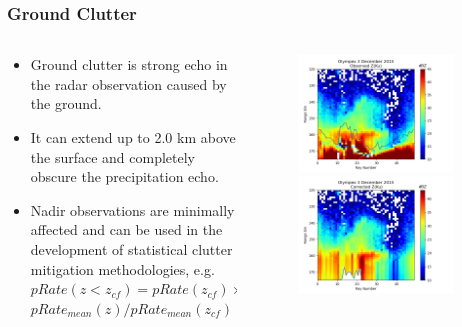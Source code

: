 \documentclass{beamer}
\begin{document}
\begin{frame}
\begin{columns}
\begin{column}{0.5\textwidth}
\begin{figure}
\begin{center}
\end{center}
\end{figure}
\end{column}
\end{columns}
\end{frame}    
\begin{frame}
\frametitle{Ground Clutter}
\begin{columns}
\begin{column}{0.55\textwidth}
    \begin{itemize}
    \item Ground clutter is strong echo in the radar observation caused 
    by the ground.
    \item It can extend up to 2.0 km above the surface and completely 
    obscure the precipitation echo.
    \item Nadir observations are minimally affected 
    and can be used in the development of statistical clutter mitigation 
    methodologies, e.g.
    $pRate(z<z_{cf})=pRate(z_{cf}) \times$
    $pRate_{mean}(z)/pRate_{mean}(z_{cf})$
    \end{itemize}
\end{column}
\begin{column}{0.5\textwidth}
    \begin{figure}
        \begin{center}
        \includegraphics[width=0.9\textwidth]{Figures/fig9.png}
        \includegraphics[width=0.9\textwidth]{Figures/fig10.png}

\end{center}
\end{figure}
\end{column}
\end{columns}
\end{frame}
\end{document}
